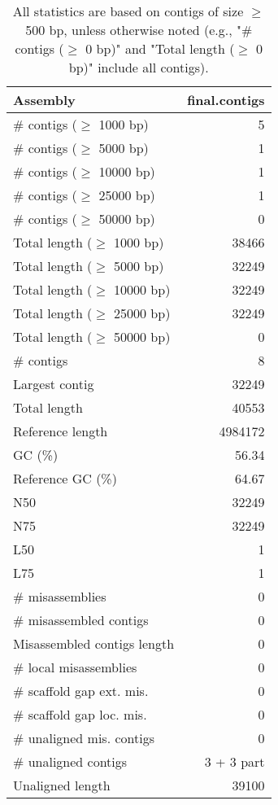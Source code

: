\documentclass[12pt,a4paper]{article}
\begin{document}
\begin{table}[ht]
\begin{center}
\caption{All statistics are based on contigs of size $\geq$ 500 bp, unless otherwise noted (e.g., "\# contigs ($\geq$ 0 bp)" and "Total length ($\geq$ 0 bp)" include all contigs).}
\begin{tabular}{|l*{1}{|r}|}
\hline
Assembly & final.contigs \\ \hline
\# contigs ($\geq$ 1000 bp) & 5 \\ \hline
\# contigs ($\geq$ 5000 bp) & 1 \\ \hline
\# contigs ($\geq$ 10000 bp) & 1 \\ \hline
\# contigs ($\geq$ 25000 bp) & 1 \\ \hline
\# contigs ($\geq$ 50000 bp) & 0 \\ \hline
Total length ($\geq$ 1000 bp) & 38466 \\ \hline
Total length ($\geq$ 5000 bp) & 32249 \\ \hline
Total length ($\geq$ 10000 bp) & 32249 \\ \hline
Total length ($\geq$ 25000 bp) & 32249 \\ \hline
Total length ($\geq$ 50000 bp) & 0 \\ \hline
\# contigs & 8 \\ \hline
Largest contig & 32249 \\ \hline
Total length & 40553 \\ \hline
Reference length & 4984172 \\ \hline
GC (\%) & 56.34 \\ \hline
Reference GC (\%) & 64.67 \\ \hline
N50 & 32249 \\ \hline
N75 & 32249 \\ \hline
L50 & 1 \\ \hline
L75 & 1 \\ \hline
\# misassemblies & 0 \\ \hline
\# misassembled contigs & 0 \\ \hline
Misassembled contigs length & 0 \\ \hline
\# local misassemblies & 0 \\ \hline
\# scaffold gap ext. mis. & 0 \\ \hline
\# scaffold gap loc. mis. & 0 \\ \hline
\# unaligned mis. contigs & 0 \\ \hline
\# unaligned contigs & 3 + 3 part \\ \hline
Unaligned length & 39100 \\ \hline

\end{tabular}
\end{center}
\end{table}
\end{document}
